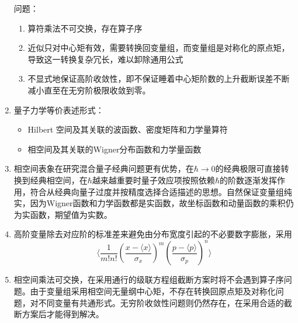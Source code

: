 \documentclass[12pt,a4paper,openany,twoside]{book}
\numberwithin{equation}{section}
\newcommand{\mean}[1]{\langle #1 \rangle}
\begin{document}
\begin{enumerate}
  问题：
  \begin{enumerate}

    \item 算符乘法不可交换，存在算子序
    \item 近似只对中心矩有效，需要转换回变量组，而变量组是对称化的原点矩，导致这一转换复杂冗长，难以卸除通用公式

    \item 不显式地保证高阶收敛性，即不保证睡着中心矩阶数的上升截断误差不断减小直至在无穷阶极限收敛到零。

  \end{enumerate}


  \item 量子力学等价表述形式：
  \begin{itemize}
    \item Hilbert 空间及其关联的波函数、密度矩阵和力学量算符
    \item 相空间及其关联的Wigner分布函数和力学量函数
  \end{itemize}

  \item 相空间表象在研究混合量子经典问题更有优势，在$\hbar \rightarrow 0$的经典极限可直接转换到经典相空间，在$\hbar$越来越重要时量子效应项按照依赖$\hbar$的阶数逐渐发挥作用，符合从经典向量子过度并按精度选择合适描述的思想。自然保证变量组纯实，因为Wigner函数和力学函数都是实函数，故坐标函数和动量函数的乘积仍为实函数，期望值为实数。

  \item 高阶变量除去对应阶的标准差来避免由分布宽度引起的不必要数字膨胀，采用
  \begin{equation}
    \mean{\frac{1}{m!n!}\left(\frac{x-\mean{x}}{\sigma_x}\right)^m\left(\frac{p-\mean{p}}{\sigma_p}\right)^n}
    \end{equation}

  \item 相空间乘法可交换，在采用通行的级联方程组截断方案时将不会遇到算子序问题。由于变量组采用相空间无量纲中心矩，不存在转换回原点矩及对称化问题，对不同变量有共通形式。无穷阶收敛性问题则仍然存在，在采用合适的截断方案后才能得到解决。  
\end{enumerate}
\end{document}
